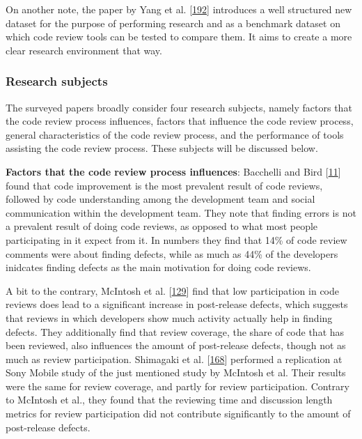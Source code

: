 \documentclass[]{book}
\begin{document}
On another note, the paper by Yang et al.
{[}\protect\hyperlink{ref-yang2016mining}{192}{]} introduces a well
structured new dataset for the purpose of performing research and as a
benchmark dataset on which code review tools can be tested to compare
them. It aims to create a more clear research environment that way.

\subsubsection{Research subjects}\label{research-subjects}

The surveyed papers broadly consider four research subjects, namely
factors that the code review process influences, factors that influence
the code review process, general characteristics of the code review
process, and the performance of tools assisting the code review process.
These subjects will be discussed below.

\textbf{Factors that the code review process influences}: Bacchelli and
Bird {[}\protect\hyperlink{ref-bacchelli2013expectations}{11}{]} found
that code improvement is the most prevalent result of code reviews,
followed by code understanding among the development team and social
communication within the development team. They note that finding errors
is not a prevalent result of doing code reviews, as opposed to what most
people participating in it expect from it. In numbers they find that
14\% of code review comments were about finding defects, while as much
as 44\% of the developers inidcates finding defects as the main
motivation for doing code reviews.

A bit to the contrary, McIntosh et al.
{[}\protect\hyperlink{ref-mcintosh2014impact}{129}{]} find that low
participation in code reviews does lead to a significant increase in
post-release defects, which suggests that reviews in which developers
show much activity actually help in finding defects. They additionally
find that review coverage, the share of code that has been reviewed,
also influences the amount of post-release defects, though not as much
as review participation. Shimagaki et al.
{[}\protect\hyperlink{ref-shimagaki2016study}{168}{]} performed a
replication at Sony Mobile study of the just mentioned study by McIntosh
et al. Their results were the same for review coverage, and partly for
review participation. Contrary to McIntosh et al., they found that the
reviewing time and discussion length metrics for review participation
did not contribute significantly to the amount of post-release defects.
\end{document}
